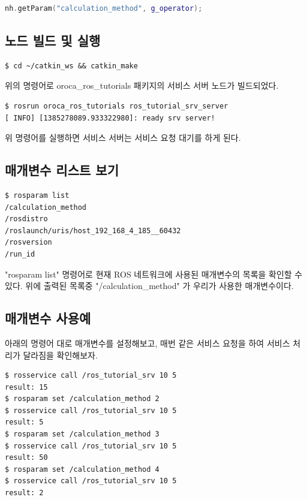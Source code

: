 \begin{lstlisting}[language=C++]
nh.getParam("calculation_method", g_operator);
\end{lstlisting}

\subsection{노드 빌드 및 실행}

\begin{lstlisting}[language=ROS]
$ cd ~/catkin_ws && catkin_make
\end{lstlisting}

\noindent
위의 명령어로 oroca\_ros\_tutorials 패키지의 서비스 서버 노드가 빌드되었다. 

\begin{lstlisting}[language=ROS]
$ rosrun oroca_ros_tutorials ros_tutorial_srv_server 
[ INFO] [1385278089.933322980]: ready srv server!
\end{lstlisting}

\noindent
위 명령어를 실행하면 서비스 서버는 서비스 요청 대기를 하게 된다.

\subsection{매개변수 리스트 보기}

\begin{lstlisting}[language=ROS]
$ rosparam list
/calculation_method
/rosdistro
/roslaunch/uris/host_192_168_4_185__60432
/rosversion
/run_id
\end{lstlisting}

\noindent
"rosparam list" 명령어로 현재 ROS 네트워크에 사용된 매개변수의 목록을 확인할 수 있다. 위에 출력된 목록중 "/calculation\_method" 가 우리가 사용한 매개변수이다.

\subsection{매개변수 사용예}

아래의 명령어 대로 매개변수를 설정해보고, 매번 같은 서비스 요청을 하여 서비스 처리가 달라짐을 확인해보자.

\vspace{\baselineskip}
\begin{lstlisting}[language=ROS]
$ rosservice call /ros_tutorial_srv 10 5
result: 15
$ rosparam set /calculation_method 2
$ rosservice call /ros_tutorial_srv 10 5
result: 5
$ rosparam set /calculation_method 3
$ rosservice call /ros_tutorial_srv 10 5
result: 50
$ rosparam set /calculation_method 4
$ rosservice call /ros_tutorial_srv 10 5
result: 2 
\end{lstlisting}

